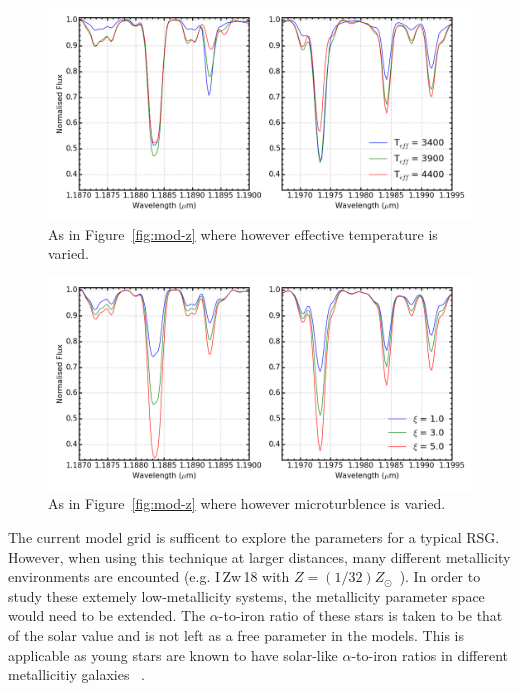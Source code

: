 \documentclass[12pt]{article}
\begin{document}
\begin{figure}
 \centering
\includegraphics[width=\textwidth]{varyTv2}
\caption{
As in Figure~\ref{fig:mod-z} where however effective temperature is varied.\label{fig:mod-t}
         }
\end{figure}

\begin{figure}
 \centering
\includegraphics[width=\textwidth]{varymicrov2}
\caption{
As in Figure~\ref{fig:mod-z} where however microturblence is varied.\label{fig:mod-micro}
         }
\end{figure}

The current model grid is sufficent to explore the parameters for a typical RSG.
However, when using this technique at larger distances,
many different metallicity environments are encounted (e.g. I\,Zw\,18 with $Z=(1/32)Z_{\odot}$~\citep{1998ApJ...508..248V}).
In order to study these extemely low-metallicity systems,
the metallicity parameter space would need to be extended.
The $\alpha$-to-iron ratio of these stars is taken to be that of the solar value and is not left as a free parameter in the models.
This is applicable as young stars are known to have solar-like $\alpha$-to-iron ratios in different metallicitiy galaxies
~\citep[see tables 3 and 4 in][and references therin]{2015ApJ...806...21D}.
\end{document}
